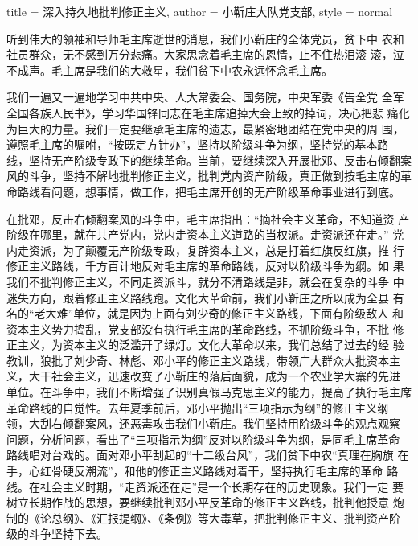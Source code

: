 \begin{hongqiarticle}{
        title  = {深入持久地批判修正主义},
        author = {小靳庄大队党支部},
        style  = normal
    }

    听到伟大的领袖和导师毛主席逝世的消息，我们小靳庄的全体党员，贫下中
    农和社员群众，无不感到万分悲痛。大家思念着毛主席的恩情，止不住热泪滚
    滚，泣不成声。毛主席是我们的大救星，我们贫下中农永远怀念毛主席。

    我们一遍又一遍地学习中共中央、人大常委会、国务院，中央军委《告全党
    全军全国各族人民书》，学习华国锋同志在毛主席追掉大会上致的掉词，决心把悲
    痛化为巨大的力量。我们一定要继承毛主席的遗志，最紧密地团结在党中央的周
    围，遵照毛主席的嘱咐，“按既定方针办”，坚持以阶级斗争为纲，坚持党的基本路
    线，坚持无产阶级专政下的继续革命。当前，要继续深入开展批邓、反击右倾翻案
    风的斗争，坚持不解地批判修正主义，批判党内资产阶级，真正做到按毛主席的革
    命路线看问题，想事情，做工作，把毛主席开创的无产阶级革命事业进行到底。

    在批邓，反击右倾翻案风的斗争中，毛主席指出：“摘社会主义革命，不知道资
    产阶级在哪里，就在共产党内，党内走资本主义道路的当权派。走资派还在走。”
    党内走资派，为了颠覆无产阶级专政，复辟资本主义，总是打着红旗反红旗，推
    行修正主义路线，千方百计地反对毛主席的革命路线，反对以阶级斗争为纲。如
    果我们不批判修正主义，不同走资派斗，就分不清路线是非，就会在复杂的斗争
    中迷失方向，跟着修正主义路线跑。文化大革命前，我们小靳庄之所以成为全县
    有名的“老大难”单位，就是因为上面有刘少奇的修正主义路线，下面有阶级敌人
    和资本主义势力捣乱，党支部没有执行毛主席的革命路线，不抓阶级斗争，不批
    修正主义，为资本主义的泛滥开了绿灯。文化大革命以来，我们总结了过去的经
    验教训，狼批了刘少奇、林彪、邓小平的修正主义路线，带领广大群众大批资本主
    义，大干社会主义，迅速改变了小靳庄的落后面貌，成为一个农业学大寨的先进
    单位。在斗争中，我们不断增强了识别真假马克思主义的能力，提高了执行毛主席
    革命路线的自觉性。去年夏季前后，邓小平抛出“三项指示为纲”的修正主义纲
    领，大刮右倾翻案风，还恶毒攻击我们小靳庄。我们坚持用阶级斗争的观点观察
    问题，分析问题，看出了“三项指示为纲”反对以阶级斗争为纲，是同毛主席革命
    路线唱对台戏的。面对邓小平刮起的“十二级台风”，我们贫下中农“真理在胸旗
    在手，心红骨硬反潮流”，和他的修正主义路线对着干，坚持执行毛主席的革命
    路线。在社会主义时期，“走资派还在走”是一个长期存在的历史现象。我们一定
    要树立长期作战的思想，要继续批判邓小平反革命的修正主义路线，批判他授意
    炮制的《论总纲》、《汇报提纲》、《条例》等大毒草，把批判修正主义、批判资产阶
    级的斗争坚持下去。


\end{hongqiarticle}
